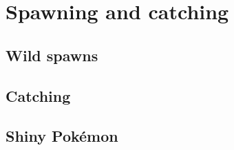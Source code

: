 \chapter{Spawning and catching}
\label{chap:spawn}

\section{Wild spawns}
\label{sec:spawns}

\section{Catching}
\label{sec:catch}

\section{Shiny Pokémon}
\label{sec:shiny}
